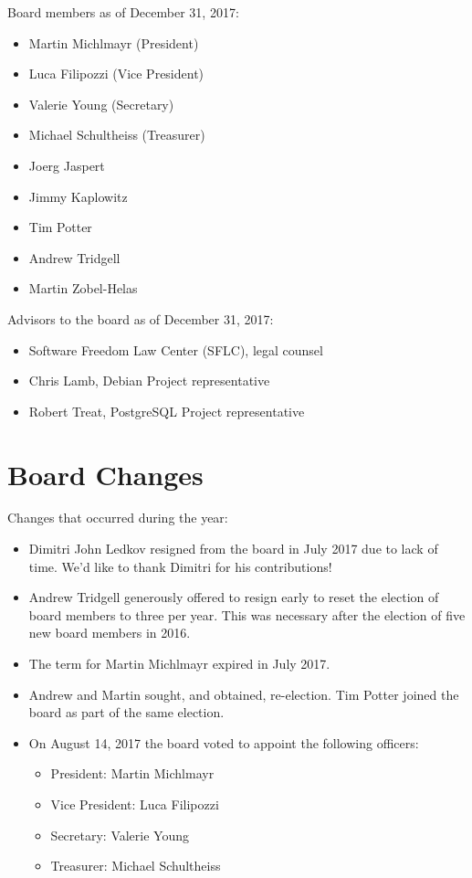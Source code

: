 \documentclass[a4paper]{report}
\begin{document}
Board members as of December 31, 2017:

\begin{itemize}
\item Martin Michlmayr (President)
\item Luca Filipozzi (Vice President)
\item Valerie Young (Secretary)
\item Michael Schultheiss (Treasurer)
\item Joerg Jaspert
\item Jimmy Kaplowitz
\item Tim Potter
\item Andrew Tridgell
\item Martin Zobel-Helas
\end{itemize}

Advisors to the board as of December 31, 2017:

\begin{itemize}
\item Software Freedom Law Center (SFLC), legal counsel
\item Chris Lamb, Debian Project representative
\item Robert Treat, PostgreSQL Project representative
\end{itemize}

\section{Board Changes}

Changes that occurred during the year:

\begin{itemize}

\item Dimitri John Ledkov resigned from the board in July 2017 due to lack
of time.  We'd like to thank Dimitri for his contributions!

\item Andrew Tridgell generously offered to resign early to reset the
election of board members to three per year. This was necessary after the
election of five new board members in 2016.

\item The term for Martin Michlmayr expired in July 2017.

\item Andrew and Martin sought, and obtained, re-election.  Tim Potter
joined the board as part of the same election.

\item On August 14, 2017 the board voted to appoint the following
officers:

\begin{itemize}
\item President: Martin Michlmayr
\item Vice President: Luca Filipozzi
\item Secretary: Valerie Young
\item Treasurer: Michael Schultheiss
\end{itemize}

\end{itemize}
\end{document}
